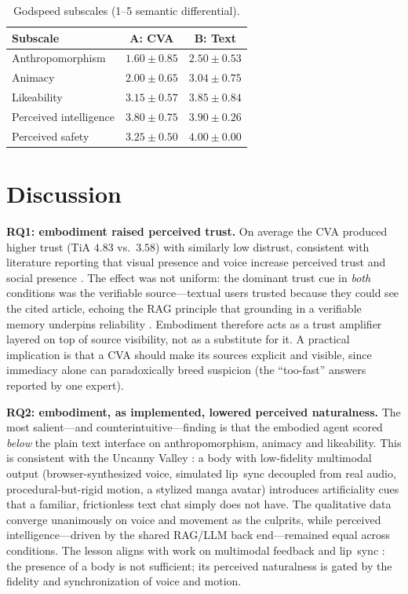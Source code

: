 \documentclass[conference]{IEEEtran}
\begin{document}
\begin{table}[t]
\caption{Godspeed subscales (1--5 semantic differential).}
\label{tab:godspeed}
\centering
\renewcommand{\arraystretch}{1.2}
\begin{tabular}{@{}lcc@{}}
\toprule
\textbf{Subscale} & \textbf{A: CVA} & \textbf{B: Text} \\
\midrule
Anthropomorphism        & $1.60 \pm 0.85$ & $2.50 \pm 0.53$ \\
Animacy                 & $2.00 \pm 0.65$ & $3.04 \pm 0.75$ \\
Likeability             & $3.15 \pm 0.57$ & $3.85 \pm 0.84$ \\
Perceived intelligence  & $3.80 \pm 0.75$ & $3.90 \pm 0.26$ \\
Perceived safety        & $3.25 \pm 0.50$ & $4.00 \pm 0.00$ \\
\bottomrule
\end{tabular}
\end{table}


\section{Discussion}
\label{sec:discussion}

\textbf{RQ1: embodiment raised perceived trust.}
On average the CVA produced higher trust (TiA $4.83$ vs.\ $3.58$) with similarly
low distrust, consistent with literature reporting that visual presence and
voice increase perceived trust and social presence \cite{wang2019,chang2022,
schmitt2022}. The effect was not uniform: the dominant trust cue in \emph{both}
conditions was the verifiable source---textual users trusted because they could
see the cited article, echoing the RAG principle that grounding in a verifiable
memory underpins reliability \cite{fan2024,roy2024}. Embodiment therefore acts
as a trust amplifier layered on top of source visibility, not as a substitute
for it. A practical implication is that a CVA should make its sources explicit
and visible, since immediacy alone can paradoxically breed suspicion (the
``too-fast'' answers reported by one expert).

\textbf{RQ2: embodiment, as implemented, lowered perceived naturalness.}
The most salient---and counterintuitive---finding is that the embodied agent
scored \emph{below} the plain text interface on anthropomorphism, animacy and
likeability. This is consistent with the Uncanny Valley \cite{mori2012}: a body
with low-fidelity multimodal output (browser-synthesized voice, simulated
lip~sync decoupled from real audio, procedural-but-rigid motion, a stylized
manga avatar) introduces artificiality cues that a familiar, frictionless text
chat simply does not have. The qualitative data converge unanimously on voice
and movement as the culprits, while perceived intelligence---driven by the
shared RAG/LLM back end---remained equal across conditions. The lesson aligns
with work on multimodal feedback and lip~sync \cite{chang2022,elfleet2024,
alalyani2023}: the presence of a body is not sufficient; its perceived
naturalness is gated by the fidelity and synchronization of voice and motion.
\end{document}
